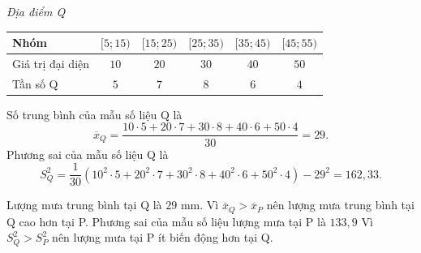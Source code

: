 \begin{ex}[Mức độ 3]
{\begin{center}
\textit{Địa điểm Q}\\
\begin{tabular}{|l|c|c|c|c|c|}
\hline
Nhóm &$[5; 15)$ & $[15; 25)$ & $[25; 35)$ & $[35; 45)$ & $[45; 55)$ \\
\hline
Giá trị đại diện & $10$ & $20$ & $30$ & $40$ & $50$ \\
\hline
Tần số Q & $5$ & $7$ & $8$ & $6$ & $4$ \\
\hline
\end{tabular}
\end{center}
Số trung bình của mẫu số liệu Q là
$$ \overline{x}_Q=\dfrac{10\cdot 5 + 20\cdot 7 + 30\cdot 8 + 40\cdot 6 + 50\cdot 4}{30} = 29. $$
Phương sai của mẫu số liệu Q là
$$S^2_Q = \dfrac{1}{30} (10^2\cdot5 + 20^2\cdot7 + 30^2\cdot8 + 40^2\cdot6 + 50^2\cdot4) - 29^2 = 162{,}33.$$
\begin{itemchoice}
\itemch Lượng mưa trung bình tại Q là $29$ mm.
\itemch Vì $\overline{x}_Q>\overline{x}_P$ nên lượng mưa trung bình tại Q cao hơn tại P.
\itemch Phương sai của mẫu số liệu lượng mưa tại P là $133{,}9$
\itemch Vì $S_Q^2>S_P^2$ nên lượng mưa tại P ít biến động hơn tại Q.
\end{itemchoice}
}
\end{ex}

